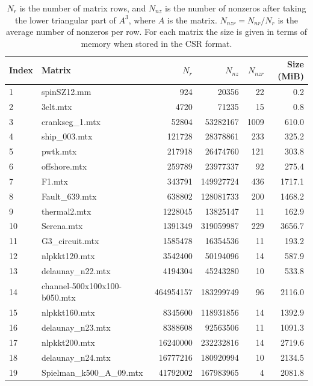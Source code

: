 \begin{table}
    \centering
    \begin{tabular}{|l|l|r|r|r|r|}
    \hline
        Index & Matrix & $N_r$ & $N_{nz}$ & $N_{nzr}$ & Size (MiB)\\ 
    \hline
        1 & spinSZ12.mm & 924 & 20356 & 22 & 0.2 \\ 
        2 &3elt.mtx & 4720 & 71235 & 15 &  0.8\\ 
        3 & crankseg\_1.mtx & 52804 & 53282167 & 1009 & 610.0\\ 
        4 & ship\_003.mtx & 121728 & 28378861 & 233 & 325.2\\ 
        5 & pwtk.mtx & 217918 & 26474760 & 121 & 303.8 \\ 
        6 & offshore.mtx & 259789 & 23977337 & 92 & 275.4 \\ 
        7 & F1.mtx & 343791 & 149927724 & 436 & 1717.1 \\ 
        8 & Fault\_639.mtx & 638802 & 128081733 & 200 & 1468.2\\ 
        9 & thermal2.mtx & 1228045 & 13825147 & 11 & 162.9 \\ 
        10 & Serena.mtx & 1391349 & 319059987 & 229 & 3656.7\\
        11 & G3\_circuit.mtx & 1585478 & 16354536 & 11&193.2\\ 
        12 & nlpkkt120.mtx & 3542400 & 50194096 & 14 & 587.9\\ 
        13 & delaunay\_n22.mtx & 4194304 & 45243280 & 10 & 533.8\\ 
        14 & channel-500x100x100-b050.mtx & 464954157 & 183299749 & 96 & 2116.0\\ 
        15 & nlpkkt160.mtx & 8345600 & 118931856 & 14 & 1392.9\\ 
        16 & delaunay\_n23.mtx & 8388608 & 92563506 & 11 &1091.3\\ 
        17 & nlpkkt200.mtx & 16240000 & 232232816 & 14 & 2719.6\\ 
        18 & delaunay\_n24.mtx & 16777216 & 180920994 & 10 & 2134.5\\ 
        19 & Spielman\_k500\_A\_09.mtx & 41792002 & 167983965 & 4 & 2081.8 \\ 
    \hline
    \end{tabular}
    \caption{$N_r$ is the number of matrix rows, and $N_{nz}$ is the number of nonzeros after taking the lower triangular part of $A^3$, where $A$ is the matrix. $N_{nzr}=N_{nr}/N_r$ is the average number of nonzeros per row. For each matrix the size is given in terms of memory when stored in the CSR format.}
    \label{tab:matrices_benchmarks}
\end{table}
